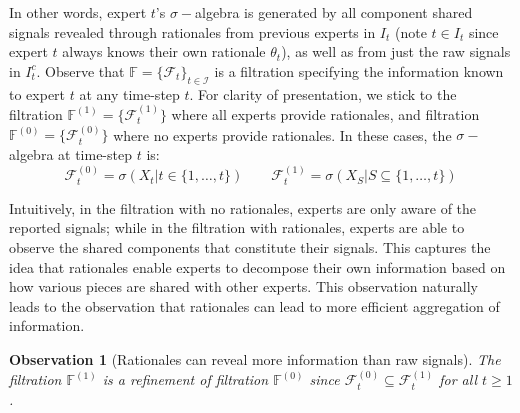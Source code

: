 \documentclass{winnower}
\newtheorem{observation}{Observation}
\begin{document}
In other words,  expert $t$'s $\sigma-$algebra is generated by all component shared signals revealed through rationales from previous experts in $I_t$ (note $t \in I_t$ since expert $t$ always knows their own rationale $\theta_t$), as well as from just the raw signals in $I_t^c$. Observe that $\mathbb{F} = \{ \mathcal{F}_t \}_{t \in \mathcal{I}}$ is a filtration specifying the information known to expert $t$ at any time-step $t$. For clarity of presentation, we stick to the filtration $\mathbb{F}^{(1)} = \{\mathcal{F}_t^{(1)}\}$ where all experts provide rationales, and filtration $\mathbb{F}^{(0)} = \{\mathcal{F}_t^{(0)}\}$ where no experts provide rationales. In these cases, the $\sigma-$algebra at time-step $t$ is:
\begin{equation}
    \mathcal{F}_t^{(0)} = \sigma\left(X_t | t \in \{1,\ldots, t\}\right)  \quad \quad \mathcal{F}_t^{(1)} = \sigma\left(X_S | S \subseteq \{1,\ldots, t\}\right) 
\end{equation}

Intuitively, in the filtration with no rationales, experts are only aware of the reported signals; while in the filtration with rationales, experts are able to observe the shared components that constitute their signals. This captures the idea that rationales enable experts to decompose their own information based on how various pieces are shared with other experts. This observation naturally leads to the observation that rationales can lead to more efficient aggregation of information.

\begin{observation}[Rationales can reveal more information than raw signals]
    The filtration $\mathbb{F}^{(1)}$ is a refinement of filtration $\mathbb{F}^{(0)}$ since $\mathcal{F}_t^{(0)} \subseteq \mathcal{F}_t^{(1)}$ for all $t \geq 1$.
\end{observation}
\end{document}
